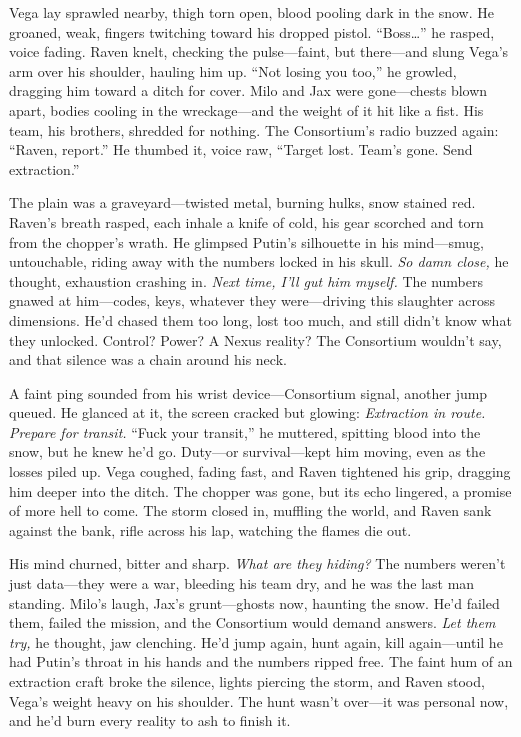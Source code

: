\documentclass[12pt]{book}
\begin{document}
Vega lay sprawled nearby, thigh torn open, blood pooling dark in the snow. He groaned, weak, fingers twitching toward his dropped pistol. “Boss…” he rasped, voice fading. Raven knelt, checking the pulse—faint, but there—and slung Vega’s arm over his shoulder, hauling him up. “Not losing you too,” he growled, dragging him toward a ditch for cover. Milo and Jax were gone—chests blown apart, bodies cooling in the wreckage—and the weight of it hit like a fist. His team, his brothers, shredded for nothing. The Consortium’s radio buzzed again: “Raven, report.” He thumbed it, voice raw, “Target lost. Team’s gone. Send extraction.”

The plain was a graveyard—twisted metal, burning hulks, snow stained red. Raven’s breath rasped, each inhale a knife of cold, his gear scorched and torn from the chopper’s wrath. He glimpsed Putin’s silhouette in his mind—smug, untouchable, riding away with the numbers locked in his skull. \textit{So damn close,} he thought, exhaustion crashing in. \textit{Next time, I’ll gut him myself.} The numbers gnawed at him—codes, keys, whatever they were—driving this slaughter across dimensions. He’d chased them too long, lost too much, and still didn’t know what they unlocked. Control? Power? A Nexus reality? The Consortium wouldn’t say, and that silence was a chain around his neck.

A faint ping sounded from his wrist device—Consortium signal, another jump queued. He glanced at it, the screen cracked but glowing: \textit{Extraction in route. Prepare for transit.} “Fuck your transit,” he muttered, spitting blood into the snow, but he knew he’d go. Duty—or survival—kept him moving, even as the losses piled up. Vega coughed, fading fast, and Raven tightened his grip, dragging him deeper into the ditch. The chopper was gone, but its echo lingered, a promise of more hell to come. The storm closed in, muffling the world, and Raven sank against the bank, rifle across his lap, watching the flames die out.

His mind churned, bitter and sharp. \textit{What are they hiding?} The numbers weren’t just data—they were a war, bleeding his team dry, and he was the last man standing. Milo’s laugh, Jax’s grunt—ghosts now, haunting the snow. He’d failed them, failed the mission, and the Consortium would demand answers. \textit{Let them try,} he thought, jaw clenching. He’d jump again, hunt again, kill again—until he had Putin’s throat in his hands and the numbers ripped free. The faint hum of an extraction craft broke the silence, lights piercing the storm, and Raven stood, Vega’s weight heavy on his shoulder. The hunt wasn’t over—it was personal now, and he’d burn every reality to ash to finish it.
\end{document}
